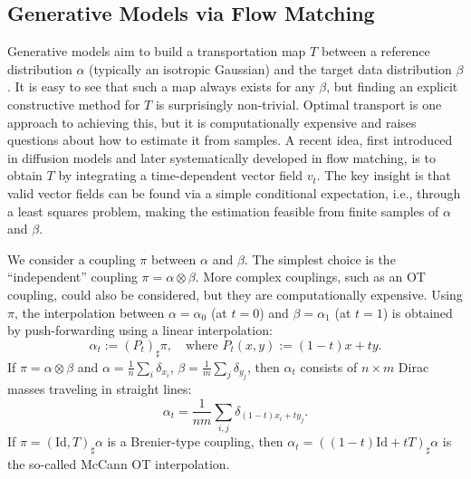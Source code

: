 \subsection{Generative Models via Flow Matching}

Generative models aim to build a transportation map $T$ between a reference distribution $\alpha$ (typically an isotropic Gaussian) and the target data distribution $\beta$. It is easy to see that such a map always exists for any $\beta$, but finding an explicit constructive method for $T$ is surprisingly non-trivial. 
%
Optimal transport is one approach to achieving this, but it is computationally expensive and raises questions about how to estimate it from samples. A recent idea, first introduced in diffusion models and later systematically developed in flow matching, is to obtain $T$ by integrating a time-dependent vector field $v_t$. The key insight is that valid vector fields can be found via a simple conditional expectation, i.e., through a least squares problem, making the estimation feasible from finite samples of $\alpha$ and $\beta$.

We consider a coupling $\pi$ between $\alpha$ and $\beta$. The simplest choice is the ``independent'' coupling $\pi = \alpha \otimes \beta$. More complex couplings, such as an OT coupling, could also be considered, but they are computationally expensive. Using $\pi$, the interpolation between $\alpha = \alpha_0$ (at $t=0$) and $\beta = \alpha_1$ (at $t=1$) is obtained by push-forwarding using a linear interpolation:
\begin{equation}
    \alpha_t := (P_t)_\sharp \pi, \quad \text{where } P_t(x, y) := (1-t)x + ty. \label{eq:interp-coupling}
\end{equation}
If $\pi = \alpha \otimes \beta$ and $\alpha = \frac{1}{n} \sum_i \delta_{x_i}$, $\beta = \frac{1}{m} \sum_j \delta_{y_j}$, then $\alpha_t$ consists of $n \times m$ Dirac masses traveling in straight lines:
\begin{equation}
    \alpha_t = \frac{1}{nm} \sum_{i,j} \delta_{(1-t)x_i + ty_j}.
\end{equation}
If $\pi = (\mathrm{Id}, T)_\sharp \alpha$ is a Brenier-type coupling, then $\alpha_t = ((1-t)\mathrm{Id} + tT)_\sharp \alpha$ is the so-called McCann OT interpolation.

